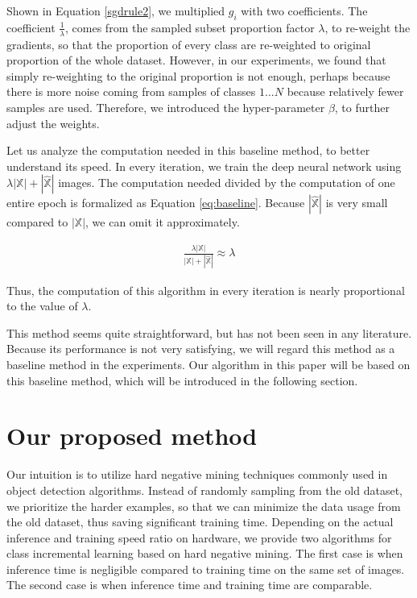 Shown in Equation \ref{sgdrule2}, we multiplied $g_i$ with two coefficients. The coefficient $\frac{1}{\lambda}$, comes from the sampled subset proportion factor $\lambda$, to re-weight the gradients, so that the proportion of every class are re-weighted to original proportion of the whole dataset. However, in our experiments, we found that simply re-weighting to the original proportion is not enough, perhaps because there is more noise coming from samples of classes $1...N$ because relatively fewer samples are used. Therefore, we introduced the hyper-parameter $\beta$, to further adjust the weights.

Let us analyze the computation needed in this baseline method, to better understand its speed. In every iteration, we train the deep neural network using $\lambda|\mathbb{X}| + |\hat{\mathbb{X}}|$ images. The computation needed divided by the computation of one entire epoch is formalized as Equation \ref{eq:baseline}. Because $|\hat{\mathbb{X}}|$ is very small compared to $|\mathbb{X}|$, we can omit it approximately.

\begin{align}
\frac{\lambda|\mathbb{X}| }{|\mathbb{X}| + |\hat{\mathbb{X}}|} \approx \lambda
\label{eq:baseline}
\end{align}

Thus, the computation of this algorithm in every iteration is nearly proportional to the value of $\lambda$.

This method seems quite straightforward, but has not been seen in any literature. Because its performance is not very satisfying, we will regard this method as a baseline method in the experiments. Our algorithm in this paper will be based on this baseline method, which will be introduced in the following section.
\label{baselinesection}

\section{Our proposed method}

Our intuition is to utilize hard negative mining techniques commonly used in object detection algorithms. Instead of randomly sampling from the old dataset, we prioritize the harder examples, so that we can minimize the data usage from the old dataset, thus saving significant training time. Depending on the actual inference and training speed ratio on hardware, we provide two algorithms for class incremental learning based on hard negative mining. The first case is when inference time is negligible compared to training time on the same set of images. The second case is when inference time and training time are comparable.

